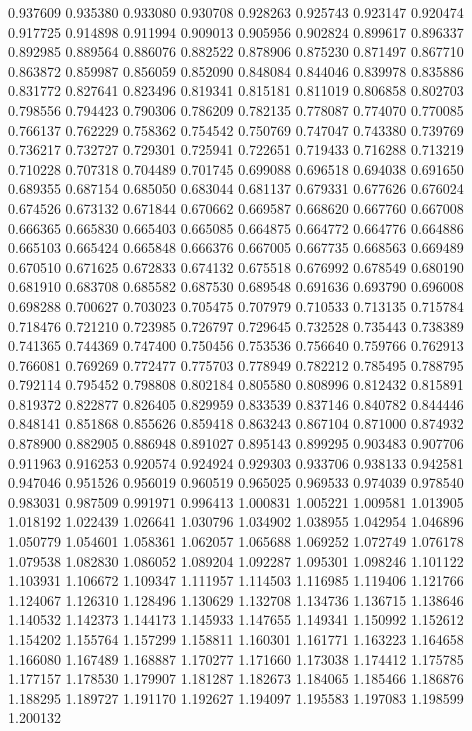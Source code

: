 0.937609
0.935380
0.933080
0.930708
0.928263
0.925743
0.923147
0.920474
0.917725
0.914898
0.911994
0.909013
0.905956
0.902824
0.899617
0.896337
0.892985
0.889564
0.886076
0.882522
0.878906
0.875230
0.871497
0.867710
0.863872
0.859987
0.856059
0.852090
0.848084
0.844046
0.839978
0.835886
0.831772
0.827641
0.823496
0.819341
0.815181
0.811019
0.806858
0.802703
0.798556
0.794423
0.790306
0.786209
0.782135
0.778087
0.774070
0.770085
0.766137
0.762229
0.758362
0.754542
0.750769
0.747047
0.743380
0.739769
0.736217
0.732727
0.729301
0.725941
0.722651
0.719433
0.716288
0.713219
0.710228
0.707318
0.704489
0.701745
0.699088
0.696518
0.694038
0.691650
0.689355
0.687154
0.685050
0.683044
0.681137
0.679331
0.677626
0.676024
0.674526
0.673132
0.671844
0.670662
0.669587
0.668620
0.667760
0.667008
0.666365
0.665830
0.665403
0.665085
0.664875
0.664772
0.664776
0.664886
0.665103
0.665424
0.665848
0.666376
0.667005
0.667735
0.668563
0.669489
0.670510
0.671625
0.672833
0.674132
0.675518
0.676992
0.678549
0.680190
0.681910
0.683708
0.685582
0.687530
0.689548
0.691636
0.693790
0.696008
0.698288
0.700627
0.703023
0.705475
0.707979
0.710533
0.713135
0.715784
0.718476
0.721210
0.723985
0.726797
0.729645
0.732528
0.735443
0.738389
0.741365
0.744369
0.747400
0.750456
0.753536
0.756640
0.759766
0.762913
0.766081
0.769269
0.772477
0.775703
0.778949
0.782212
0.785495
0.788795
0.792114
0.795452
0.798808
0.802184
0.805580
0.808996
0.812432
0.815891
0.819372
0.822877
0.826405
0.829959
0.833539
0.837146
0.840782
0.844446
0.848141
0.851868
0.855626
0.859418
0.863243
0.867104
0.871000
0.874932
0.878900
0.882905
0.886948
0.891027
0.895143
0.899295
0.903483
0.907706
0.911963
0.916253
0.920574
0.924924
0.929303
0.933706
0.938133
0.942581
0.947046
0.951526
0.956019
0.960519
0.965025
0.969533
0.974039
0.978540
0.983031
0.987509
0.991971
0.996413
1.000831
1.005221
1.009581
1.013905
1.018192
1.022439
1.026641
1.030796
1.034902
1.038955
1.042954
1.046896
1.050779
1.054601
1.058361
1.062057
1.065688
1.069252
1.072749
1.076178
1.079538
1.082830
1.086052
1.089204
1.092287
1.095301
1.098246
1.101122
1.103931
1.106672
1.109347
1.111957
1.114503
1.116985
1.119406
1.121766
1.124067
1.126310
1.128496
1.130629
1.132708
1.134736
1.136715
1.138646
1.140532
1.142373
1.144173
1.145933
1.147655
1.149341
1.150992
1.152612
1.154202
1.155764
1.157299
1.158811
1.160301
1.161771
1.163223
1.164658
1.166080
1.167489
1.168887
1.170277
1.171660
1.173038
1.174412
1.175785
1.177157
1.178530
1.179907
1.181287
1.182673
1.184065
1.185466
1.186876
1.188295
1.189727
1.191170
1.192627
1.194097
1.195583
1.197083
1.198599
1.200132
